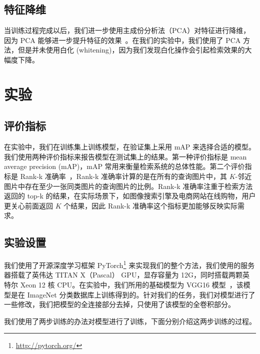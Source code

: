\subsection{特征降维}
当训练过程完成以后，我们进一步使用主成份分析法（PCA）对特征进行降维，因为 PCA 能够进一步提升特征的效果~\cite{Radenovic2016CNNIR,Babenko2014NeuralCF,Tolias2015ParticularOR,Babenko2015AggregatingLD}。在我们的实验中，我们使用了 PCA 方法，但是并未使用白化 (whitening)，因为我们发现白化操作会引起检索效果的大幅度下降。

\section{实验}\label{sec:double_margin_exprt}
\subsection{评价指标}
在实验中，我们在训练集上训练模型，在验证集上采用 mAP 来选择合适的模型。我们使用两种评价指标来报告模型在测试集上的结果。第一种评价指标是 mean average precision (mAP)，mAP 常用来衡量检索系统的总体性能。第二个评价指标是 Rank-k 准确率~\cite{Jgou2011ProductQF,Song2016DeepML}，Rank-k 准确率计算的是在所有的查询图片中，其 $K$-邻近图片中存在至少一张同类图片的查询图片的比例。Rank-k 准确率注重于检索方法返回的 top-k 的结果，在实际场景下，如图像搜索引擎及电商网站在线购物，用户更关心前面返回 $K$ 个结果，因此 Rank-k 准确率这个指标更加能够反映实际需求。

\subsection{实验设置}
我们使用了开源深度学习框架 PyTorch\footnote{\url{http://pytorch.org/}} 来实现我们的整个方法，我们使用的服务器搭载了英伟达 TITAN X（Pascal） GPU，显存容量为 12G，同时搭载两颗英特尔 Xeon 12 核 CPU。在实验中，我们所用的基础模型为 VGG16 模型~\cite{Simonyan2014VeryDC}，该模型是在 ImageNet 分类数据库上训练得到的。针对我们的任务，我们对模型进行了一些修改，我们把模型的全连接部分去掉，只使用了该模型的全卷积部分。

我们使用了两步训练的办法对模型进行了训练，下面分别介绍这两步训练的过程。


